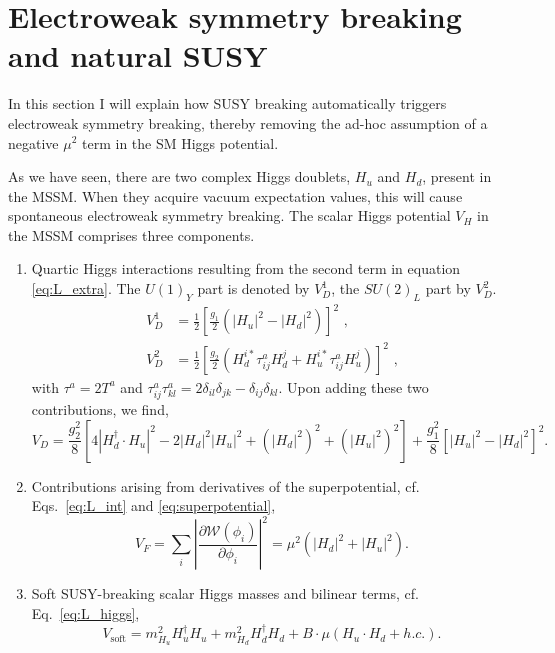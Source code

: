 \section{Electroweak symmetry breaking and natural SUSY  \label{sec:susy_EWbreaking}}

In this section I will explain how SUSY breaking automatically triggers electroweak symmetry
breaking, thereby removing the ad-hoc assumption of a negative $\mu^2$ term in the SM Higgs
potential. 

As we have seen, there are two complex Higgs doublets, $H_u$ and $H_d$, present in the MSSM. 
When they acquire vacuum expectation values, this will cause spontaneous electroweak symmetry
breaking. The scalar Higgs potential $V_H$ in the MSSM comprises three components.  

\begin{enumerate}
  \item Quartic Higgs interactions resulting from the second term in equation \ref{eq:L_extra}. The
$U(1)_Y$ part is denoted by $V_D^1$, the $SU(2)_L$ part by $V_D^2$. 
  \begin{align}
  V_D^1 &= \frac{1}{2} \left[ \frac{g_1}{2} \left( |H_u|^2 - |H_d|^2 \right) \right]^2 \textrm{ ,}\\
  V_D^2 &= \frac{1}{2} \left[ \frac{g_2}{2} \left( H_d^{i*}\tau_{ij}^aH_d^j +
H_u^{i*}\tau_{ij}^aH_u^j \right) \right]^2 \textrm{ ,}
\end{align}
with $\tau^a = 2 T^a$ and $\tau_{ij}^a \tau_{kl}^a = 2\delta_{il}\delta_{jk} -
\delta_{ij}\delta_{kl}$. 
Upon adding these two contributions, we find,
\begin{equation}
  V_D = \frac{g^2_2}{8} \left[ 4|H_d^\dagger \cdot H_u|^2 - 2|H_d|^2|H_u|^2 + (|H_d|^2)^2 +
(|H_u|^2)^2 \right] + \frac{g^2_1}{8} \left[ |H_u|^2 - |H_d|^2 \right]^2 .
\end{equation}

\item Contributions arising from derivatives of the superpotential, cf. Eqs.~\ref{eq:L_int} and
\ref{eq:superpotential},
\begin{equation}
  V_F = \sum_i \left| \frac{\partial \mathcal{W}(\phi_i)}{\partial \phi_i} \right|^2 = \mu^2
\left(|H_d|^2 + |H_u|^2\right).
\end{equation}

\item Soft SUSY-breaking scalar Higgs masses and bilinear terms, cf. Eq.~\ref{eq:L_higgs}, 
\begin{equation}
  V_\textrm{soft} = m^2_{H_u} H_u^\dagger H_u + m^2_{H_d} H_d^\dagger H_d + B \cdot \mu (H_u \cdot
H_d + h.c.) .
\end{equation}

\end{enumerate}
